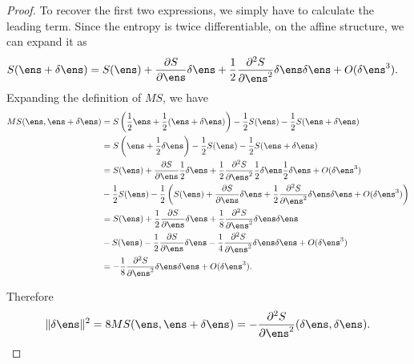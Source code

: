 \begin{mathSection}
\begin{proof}
	To recover the first two expressions, we simply have to calculate the leading term. Since the entropy is twice differentiable, on the affine structure, we can expand it as
	\begin{equation}
		\begin{aligned}
			S(\ens + \delta \ens) &= S(\ens) + \frac{\partial S}{\partial \ens} \delta \ens + \frac{1}{2} \frac{\partial^2 S}{\partial \ens^2} \delta \ens \delta \ens + O(\delta \ens ^3).
		\end{aligned}
	\end{equation}
	Expanding the definition of $MS$, we have
	\begin{equation}
		\begin{aligned}
			MS(\ens, \ens + \delta \ens) &= S\left(\frac{1}{2} \ens + \frac{1}{2}(\ens + \delta \ens) \right) - \frac{1}{2} S(\ens) - \frac{1}{2} S(\ens+\delta \ens) \\
			&=  S\left(\ens + \frac{1}{2} \delta \ens \right) - \frac{1}{2} S(\ens) - \frac{1}{2} S(\ens+\delta \ens) \\
			&= S(\ens) + \frac{\partial S}{\partial \ens} \frac{1}{2}\delta \ens + \frac{1}{2} \frac{\partial^2 S}{\partial \ens^2} \frac{1}{2}\delta \ens \frac{1}{2}\delta \ens + O(\delta \ens ^3) \\
			&- \frac{1}{2} S(\ens) - \frac{1}{2} \left( S(\ens) + \frac{\partial S}{\partial \ens} \delta \ens + \frac{1}{2} \frac{\partial^2 S}{\partial \ens^2} \delta \ens \delta \ens + O(\delta \ens ^3) \right) \\
			&= S(\ens) + \frac{1}{2} \frac{\partial S}{\partial \ens} \delta \ens + \frac{1}{8} \frac{\partial^2 S}{\partial \ens^2} \delta \ens \delta \ens \\
			&- S(\ens) - \frac{1}{2} \frac{\partial S}{\partial \ens} \delta \ens - \frac{1}{4} \frac{\partial^2 S}{\partial \ens^2} \delta \ens \delta \ens + O(\delta \ens ^3) \\
			&= - \frac{1}{8} \frac{\partial^2 S}{\partial \ens^2} \delta \ens \delta \ens + O(\delta \ens ^3).
		\end{aligned}
	\end{equation}
	
	Therefore
	$$ \lVert \delta \ens \rVert^2 = 8 MS(\ens, \ens + \delta \ens) = -  \frac{\partial^2 S}{\partial \ens^2} (\delta \ens, \delta \ens).$$
	

\end{proof}
\end{mathSection}
